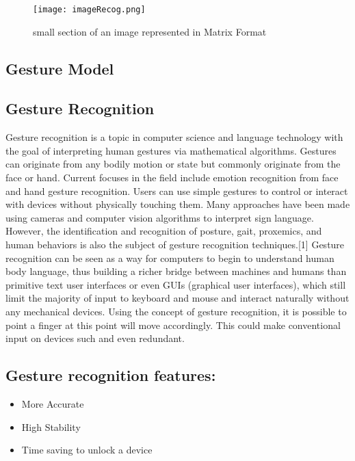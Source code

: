 \documentclass[12pt,a4paper]{article}
\begin{document}
\begin{figure}[h]
	\centering
	\texttt{[image: imageRecog.png]}
	\caption{small section of an image represented in Matrix Format}
\end{figure}

\newpage
\begin{center}
\section{Gesture Model}
\end{center}

\subsection{Gesture Recognition}
Gesture recognition is a topic in computer science and language technology with the goal of interpreting human gestures via mathematical algorithms. Gestures can originate from any bodily motion or state but commonly originate from the face or hand. Current focuses in the field include emotion recognition from face and hand gesture recognition. Users can use simple gestures to control or interact with devices without physically touching them. Many approaches have been made using cameras and computer vision algorithms to interpret sign language. However, the identification and recognition of posture, gait, proxemics, and human behaviors is also the subject of gesture recognition techniques.[1] Gesture recognition can be seen as a way for computers to begin to understand human body language, thus building a richer bridge between machines and humans than primitive text user interfaces or even GUIs (graphical user interfaces), which still limit the majority of input to keyboard and mouse and interact naturally without any mechanical devices. Using the concept of gesture recognition, it is possible to point a finger at this point will move accordingly. This could make conventional input on devices such and even redundant. 
\par 
\subsection{Gesture recognition features:}
\begin{itemize}
\item More Accurate
\item High Stability
\item Time saving to unlock a device
\end{itemize}
\par 
\end{document}
